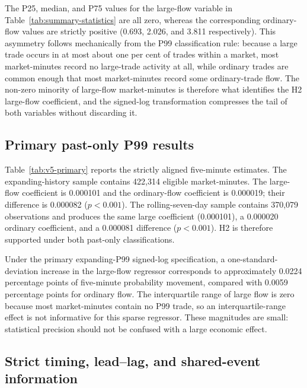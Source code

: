 The P25, median, and P75 values for the large-flow variable in Table~\ref{tab:summary-statistics} are all zero, whereas the corresponding ordinary-flow values are strictly positive (0.693, 2.026, and 3.811 respectively). This asymmetry follows mechanically from the P99 classification rule: because a large trade occurs in at most about one per cent of trades within a market, most market-minutes record no large-trade activity at all, while ordinary trades are common enough that most market-minutes record some ordinary-trade flow. The non-zero minority of large-flow market-minutes is therefore what identifies the H2 large-flow coefficient, and the signed-log transformation compresses the tail of both variables without discarding it.





\subsection{Primary past-only P99 results}

Table~\ref{tab:v5-primary} reports the strictly aligned five-minute estimates.
The expanding-history sample contains 422,314 eligible market-minutes. The
large-flow coefficient is 0.000101 and the ordinary-flow coefficient is
0.000019; their difference is 0.000082 ($p<0.001$). The rolling-seven-day
sample contains 370,079 observations and produces the same large coefficient
(0.000101), a 0.000020 ordinary coefficient, and a 0.000081 difference
($p<0.001$). H2 is therefore supported under both past-only classifications.

Under the primary expanding-P99 signed-log specification, a
one-standard-deviation increase in the large-flow regressor corresponds to
approximately 0.0224 percentage points of five-minute probability movement,
compared with 0.0059 percentage points for ordinary flow. The
interquartile range of large flow is zero because most market-minutes contain no
P99 trade, so an interquartile-range effect is not informative for this sparse
regressor. These magnitudes are small: statistical precision should not be
confused with a large economic effect.



\subsection{Strict timing, lead--lag, and shared-event information}

